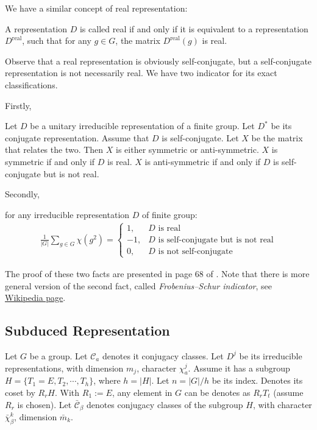 We have a similar concept of real representation:
\begin{defi}
    A representation $D$ is called real if and only if it is
    equivalent to a representation $D^\text{real}$, such that for any
    $g\in G$, the matrix $D^\text{real}(g)$ is real.
\end{defi}

Observe that a real representation is obviously self-conjugate, but a
self-conjugate representation is not necessarily real. We have two
indicator for its exact classifications.

Firstly,
\begin{thm}
    Let $D$ be a unitary irreducible representation of a finite group.
    Let $D^*$ be its conjugate representation. Assume that $D$ is
    self-conjugate. Let $X$ be the matrix that relates the two. Then
    $X$ is either symmetric or anti-symmetric. $X$ is symmetric if and
    only if $D$ is real. $X$ is anti-symmetric if and only if $D$ is
    self-conjugate but is not real.
\end{thm}

Secondly, 
\begin{thm}
    for any irreducible representation $D$ of finite group:
    \begin{align}
        \frac{1}{|G|}\sum_{g\in G} \chi(g^2) = \begin{cases}
            1, & \text{$D$ is real} \\
            -1, & \text{$D$ is self-conjugate but is not real} \\
            0, & \text{$D$ is not self-conjugate}
        \end{cases}
    \end{align}
\end{thm}

The proof of these two facts are presented in page 68 of \cite{book}.
Note that there is more general version of the second fact, called
\textit{Frobenius–Schur indicator}, see
\href{https://en.wikipedia.org/wiki/Frobenius%E2%80%93Schur_indicator}
{Wikipedia page}.

\subsection{Subduced Representation}
\label{sec:Subduced-Representation}
Let $G$ be a group. Let $\mathcal{C}_a$ denotes it conjugacy classes.
Let $D^j$ be its irreducible representations, with dimension $m_j$,
character $\chi^j_a$. Assume it has a subgroup $H=\{T_1=E,
T_2,\cdots,T_h\}$, where $h=|H|$. Let $n=|G|/h$ be its index. Denotes
its coset by $R_rH$. With $R_1:=E$, any element in $G$ can be denotes
as $R_r T_t$ (assume $R_r$ is chosen). Let $\bar{\mathcal{C}}_\beta$
denotes conjugacy classes of the subgroup $H$, with character
$\bar{\chi}^k_\beta$, dimension $\bar{m}_k$.

